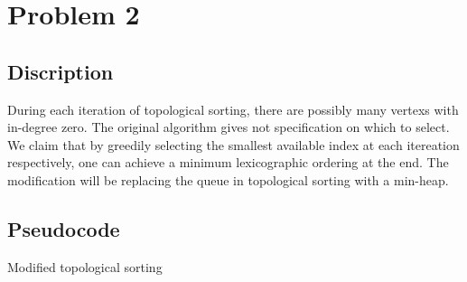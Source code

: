 \documentclass{report}
\begin{document}
    \section*{Problem 2}
    \subsection*{Discription}
    During each iteration of topological sorting, there are possibly many vertexs with 
    in-degree zero. The original algorithm gives not specification on which to select. 
    We claim that by greedily selecting the smallest available index at each itereation 
    respectively, one can achieve a minimum lexicographic ordering at the end.
    The modification will be replacing the queue in topological sorting with a min-heap. 
    \newpage
    \subsection*{Pseudocode}
    \begin{algorithm}
        \caption{Modified topological sorting}
        \begin{algorithmic}[1]
                \EndIf{}
            \EndFor{}
                    \EndIf{}
                \EndFor{}
            \EndWhile{}
        \end{algorithmic}
    \end{algorithm}
\end{document}
